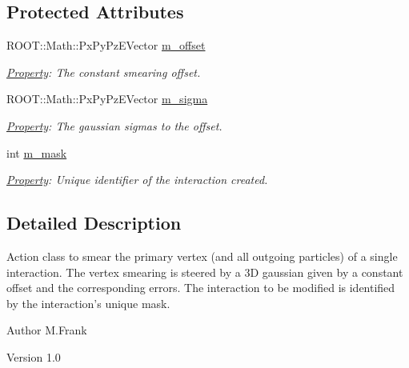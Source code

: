 \subsection*{Protected Attributes}
\begin{DoxyCompactItemize}
\item 
ROOT::Math::PxPyPzEVector \hyperlink{class_d_d4hep_1_1_simulation_1_1_geant4_interaction_vertex_smear_a34e2bcca2e7e15bad2fae703422fa22c}{m\_\-offset}
\begin{DoxyCompactList}\small\item\em \hyperlink{class_d_d4hep_1_1_property}{Property}: The constant smearing offset. \item\end{DoxyCompactList}\item 
ROOT::Math::PxPyPzEVector \hyperlink{class_d_d4hep_1_1_simulation_1_1_geant4_interaction_vertex_smear_a407c72b211c3733623129565bcc71e0c}{m\_\-sigma}
\begin{DoxyCompactList}\small\item\em \hyperlink{class_d_d4hep_1_1_property}{Property}: The gaussian sigmas to the offset. \item\end{DoxyCompactList}\item 
int \hyperlink{class_d_d4hep_1_1_simulation_1_1_geant4_interaction_vertex_smear_a1862cd4719c77831e20725e7228bd6f1}{m\_\-mask}
\begin{DoxyCompactList}\small\item\em \hyperlink{class_d_d4hep_1_1_property}{Property}: Unique identifier of the interaction created. \item\end{DoxyCompactList}\end{DoxyCompactItemize}


\subsection{Detailed Description}
Action class to smear the primary vertex (and all outgoing particles) of a single interaction. The vertex smearing is steered by a 3D gaussian given by a constant offset and the corresponding errors. The interaction to be modified is identified by the interaction's unique mask.

\begin{DoxyAuthor}{Author}
M.Frank 
\end{DoxyAuthor}
\begin{DoxyVersion}{Version}
1.0 
\end{DoxyVersion}


